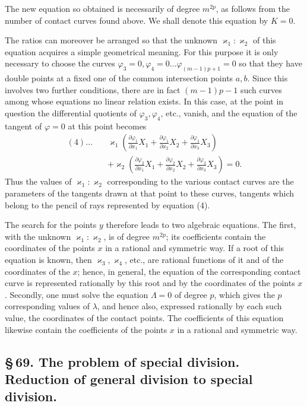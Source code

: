 \documentclass[10pt]{article}
\begin{document}
The new equation so obtained is necessarily of degree \(m^{2p}\), as follows from the number of contact curves found above. We shall denote this equation by \(K=0\).

The ratios can moreover be arranged so that the unknown \(\varkappa_1:\varkappa_2\) of this equation acquires a simple geometrical meaning. For this purpose it is only necessary to choose the curves \(\varphi_3=0,\varphi_4=0\ldots\varphi_{(m-1)p+1}=0\) so that they have double points at a fixed one of the common intersection points \(a,b\). Since this involves two further conditions, there are in fact \((m-1)p-1\) such curves among whose equations no linear relation exists. In this case, at the point in question the differential quotients of \(\varphi_3,\varphi_4\), etc., vanish, and the equation of the tangent of \(\varphi=0\) at this point becomes
\[
\begin{aligned}
(4)\ldots\quad&
\varkappa_1\left(
\frac{\partial\varphi_1}{\partial x_1}X_1+
\frac{\partial\varphi_1}{\partial x_2}X_2+
\frac{\partial\varphi_1}{\partial x_3}X_3
\right)\\
&+\varkappa_2\left(
\frac{\partial\varphi_2}{\partial x_1}X_1+
\frac{\partial\varphi_2}{\partial x_2}X_2+
\frac{\partial\varphi_2}{\partial x_3}X_3
\right)=0.
\end{aligned}
\]
Thus the values of \(\varkappa_1:\varkappa_2\) corresponding to the various contact curves are the parameters of the tangents drawn at that point to these curves, tangents which belong to the pencil of rays represented by equation (4).

The search for the points \(y\) therefore leads to two algebraic equations. The first, with the unknown \(\varkappa_1:\varkappa_2\), is of degree \(m^{2p}\); its coefficients contain the coordinates of the points \(x\) in a rational and symmetric way. If a root of this equation is known, then \(\varkappa_3,\varkappa_4\), etc., are rational functions of it and of the coordinates of the \(x\); hence, in general, the equation of the corresponding contact curve is represented rationally by this root and by the coordinates of the points \(x\). Secondly, one must solve the equation \(\Lambda=0\) of degree \(p\), which gives the \(p\) corresponding values of \(\lambda\), and hence also, expressed rationally by each such value, the coordinates of the contact points. The coefficients of this equation likewise contain the coefficients of the points \(x\) in a rational and symmetric way.

\subsection*{\S\,69. The problem of special division. Reduction of general division to special division.}
\end{document}
